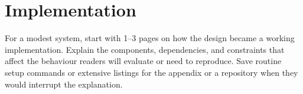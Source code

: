 \chapter{Implementation}
\label{chap:implementation}

For a modest system, start with 1--3 pages on how the design became a working implementation. Explain the components, dependencies, and constraints that affect the behaviour readers will evaluate or need to reproduce. Save routine setup commands or extensive listings for the appendix or a repository when they would interrupt the explanation.
